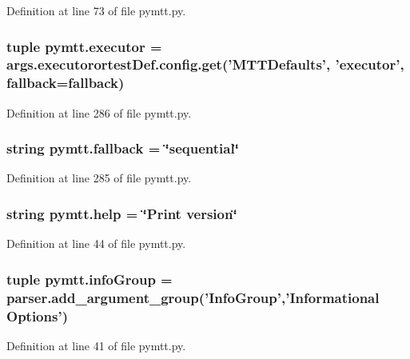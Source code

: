 Definition at line 73 of file pymtt.\-py.

\hypertarget{namespacepymtt_a283715e769294f7b1362c85498cdf2a3}{
\subsubsection[{executor}]{\setlength{\rightskip}{0pt plus 5cm}tuple pymtt.\-executor = args.\-executorortest\-Def.\-config.\-get('M\-T\-T\-Defaults', 'executor', {\bf fallback}={\bf fallback})}}\label{namespacepymtt_a283715e769294f7b1362c85498cdf2a3}


Definition at line 286 of file pymtt.\-py.

\hypertarget{namespacepymtt_a5d5ee597f85e5c40ec6a923a4398c291}{
\subsubsection[{fallback}]{\setlength{\rightskip}{0pt plus 5cm}string pymtt.\-fallback = \char`\"{}sequential\char`\"{}}}\label{namespacepymtt_a5d5ee597f85e5c40ec6a923a4398c291}


Definition at line 285 of file pymtt.\-py.

\hypertarget{namespacepymtt_a21e88c39af91deb569da20633d245b09}{
\subsubsection[{help}]{\setlength{\rightskip}{0pt plus 5cm}string pymtt.\-help = \char`\"{}Print version\char`\"{}}}\label{namespacepymtt_a21e88c39af91deb569da20633d245b09}


Definition at line 44 of file pymtt.\-py.

\hypertarget{namespacepymtt_a99ad2929ecc4e17f97670bed44f08c35}{
\subsubsection[{info\-Group}]{\setlength{\rightskip}{0pt plus 5cm}tuple pymtt.\-info\-Group = parser.\-add\-\_\-argument\-\_\-group('Info\-Group','Informational Options')}}\label{namespacepymtt_a99ad2929ecc4e17f97670bed44f08c35}


Definition at line 41 of file pymtt.\-py.

